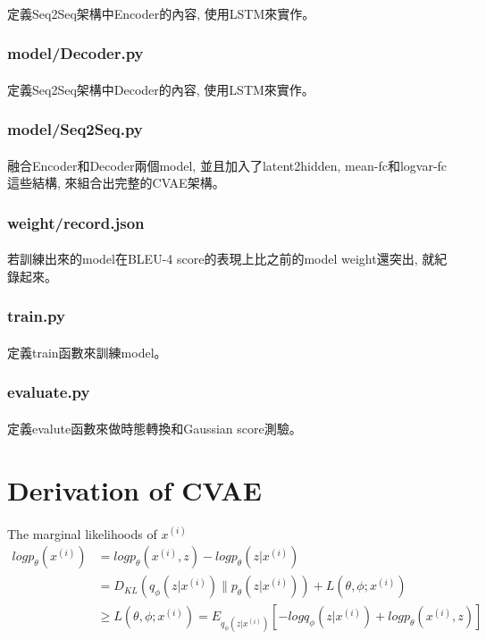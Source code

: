 \paragraph{}
定義Seq2Seq架構中Encoder的內容, 使用LSTM來實作。
\subsubsection{model/Decoder.py}
\paragraph{}
定義Seq2Seq架構中Decoder的內容, 使用LSTM來實作。
\subsubsection{model/Seq2Seq.py}
\paragraph{}
融合Encoder和Decoder兩個model, 並且加入了latent2hidden, mean-fc和logvar-fc這些結構, 來組合出完整的CVAE架構。
\subsubsection{weight/record.json}
\paragraph{}
若訓練出來的model在BLEU-4 score的表現上比之前的model weight還突出, 就紀錄起來。
\subsubsection{train.py}
\paragraph{}
定義train函數來訓練model。
\subsubsection{evaluate.py}
\paragraph{}
定義evalute函數來做時態轉換和Gaussian score測驗。
\section{Derivation of CVAE}
\paragraph{}
The marginal likelihoods of $x^{(i)}$
\begin{equation}
\begin{aligned}
log p_\theta(x^{(i)})
&= log p_\theta(x^{(i)}, z) - log p_\theta(z|x^{(i)}) \\
&= D_{KL}(q_\phi(z|x^{(i)})\|p_\theta(z|x^{(i)})) + L(\theta,\phi;x^{(i)}) \\
&\geq L(\theta, \phi;x^{(i)}) = E_{q_\phi(z|x^{(i)})}[-log q_\phi(z|x^{(i)})+log p_\theta(x^{(i)}, z)]
\end{aligned}
\end{equation}

